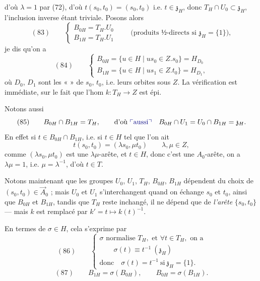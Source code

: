 \documentclass[11pt,a4paper]{article}
\begin{document}
d'où $\lambda = 1$ par (72), d'où $t(s_0,t_0) = (s_0,t_0)$ i.e. $t\in\mathfrak{z}_H$, donc
$T_H\cap U_0\subset\mathfrak{z}_H$, l'inclusion inverse étant triviale.  Posons
alors
\[
(83)\qquad
\begin{cases}
B_{0H} = T_H.U_0\\
B_{1H} = T_H.U_1
\end{cases}
\qquad \text{(produits ½-directs si } \mathfrak{z}_H = \{1\}) ,
\]
je dis qu'on a
\[
(84)\qquad
\begin{cases}
B_{0H} = \{u\in H \mid us_0\in Z.s_0\} = H_{D_0}\\
B_{1H} = \{u\in H \mid us_1\in Z.t_0\} = H_{D_1} ,
\end{cases}
\]
où $D_0$, $D_1$ sont les «  » de $s_0$, $t_0$, i.e. leurs orbites sous $Z$. La
vérification est immédiate, sur le fait que l'hom $k : T_H\to Z$ est épi.

Notons aussi
\[
(85)\qquad B_{0H}\cap B_{1H} = T_H, \qquad \text{d'où \add{aussi}}\quad
B_{0H}\cap U_1 = U_0\cap B_{1H} = \mathfrak{z}_H .
\]
En effet si $t\in B_{0H}\cap B_{1H}$, i.e. si $t\in H$ tel que l'on ait
\[
t(s_0,t_0) = (\lambda s_0, \mu t_0) \qquad \lambda,\mu\in Z ,
\]
comme $(\lambda s_0,\mu t_0)$ est une $\lambda\mu$-arête, et $t\in H$, donc c'est une
$A_0$-arête, on a $\lambda\mu = 1$, i.e. $\mu = \lambda^{-1}$, d'où $t\in T$. \struck{\ill{}}

Notons maintenant que les groupes $U_0$, $U_1$, $T_H$, $B_{0H}$, $B_{1H}$ dépendent du choix
de $(s_0,t_0)\in\vec{A}_0$ ; mais $U_0$ et $U_1$ s'interchangent quand on échange $s_0$ et
$t_0$, ainsi que $B_{0H}$ et $B_{1H}$, tandis que $T_H$ reste inchangé, il ne dépend que de
\emph{l'arête} $\{s_0,t_0\}$ — mais $k$ est remplacé par $k' = t\mapsto k(t)^{-1}$.

En termes de $\sigma\in H$, cela s'exprime par
\[
(86)\qquad
\begin{cases}
\sigma \text{ normalise } T_H, \text{ et } \forall t\in T_H, \text{ on a}\\
\qquad \sigma(t) \equiv t^{-1} \ (\mathfrak{z}_H)\\
\text{donc}\quad \sigma(t) = t^{-1} \ \text{si}\ \mathfrak{z}_H = \{1\} .
\end{cases}
\]
\[
(87)\qquad B_{1H} = \sigma(B_{0H}), \qquad B_{0H} = \sigma(B_{1H}) .
\]
\end{document}
